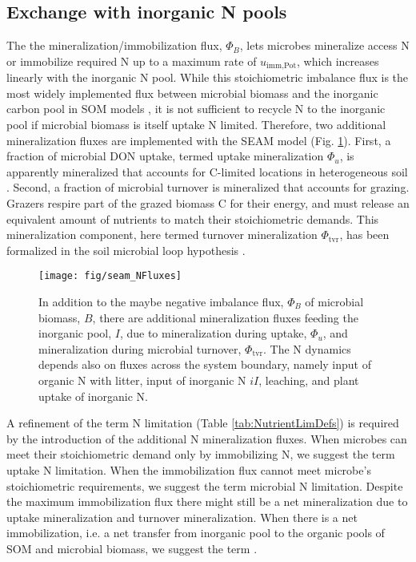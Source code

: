 \subsection{Exchange with inorganic N pools}

The the mineralization/immobilization flux, $\Phi_B$, lets microbes mineralize
access N or immobilize required N up to a maximum rate of
$u_{\operatorname{imm,Pot}}$, which increases linearly with the inorganic N
pool.
While this stoichiometric imbalance flux is the most widely implemented flux
between microbial biomass and the inorganic carbon pool in SOM
models \citep{Manzoni09}, it is not sufficient to recycle N to the inorganic
pool if microbial biomass is itself uptake N limited.
Therefore, two additional mineralization fluxes are implemented with the SEAM
model (Fig. \ref{fig:SEAMStructNFluxes}). First, a fraction of microbial DON
uptake, termed uptake mineralization $\Phi_u$, is apparently mineralized that
accounts for C-limited locations in heterogeneous soil \citep{Manzoni08}.
Second, a fraction of microbial turnover is mineralized that accounts for
grazing. Grazers respire part of the grazed biomass C for their energy, and must
release an equivalent amount of nutrients to match their stoichiometric demands.
This mineralization component, here termed turnover mineralization
$\Phi_{\operatorname{tvr}}$, has been formalized in the soil microbial loop
hypothesis \citep{Clarholm85, Raynaud06}.

\begin{figure}[t] \vspace*{2mm}
\begin{center}
\texttt{[image: fig/seam\_NFluxes]} 
\end{center}
\caption{
In addition to the maybe negative imbalance flux, $\Phi_B$ of microbial biomass,
$B$, there are additional mineralization fluxes feeding the inorganic pool, $I$,
due to mineralization during uptake, $\Phi_u$, and mineralization during
microbial turnover, $\Phi_{\operatorname{tvr}}$. The N dynamics depends also on
fluxes across the system boundary, namely input of organic N with litter, input
of inorganic N $iI$, leaching, and plant uptake of inorganic N.
\label{fig:SEAMStructNFluxes}}
\end{figure}

A refinement of the term N limitation (Table \ref{tab:NutrientLimDefs}) is
required by the introduction of the additional N mineralization fluxes.
When microbes can meet their stoichiometric demand only by immobilizing
 N, we suggest the term uptake N limitation.
When the immobilization flux cannot meet microbe's stoichiometric requirements,
we suggest the term microbial N limitation. Despite the maximum immobilization
flux there might still be a net mineralization due to uptake mineralization and
turnover mineralization.
When there is a net immobilization, i.e. a net transfer from inorganic pool to
the organic pools of SOM and microbial biomass, we suggest the term .

